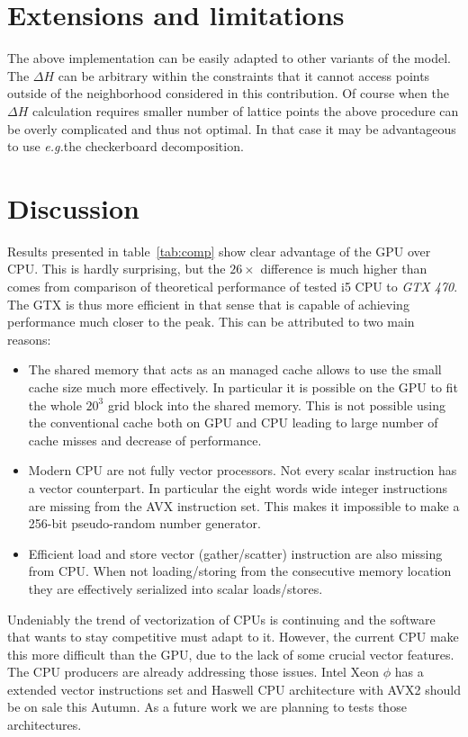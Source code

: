 \documentclass[a4paper]{llncs}
\newcommand{\eg}{\textit{e.g.}}
\begin{document}
\section{Extensions and limitations}

The above implementation can be easily adapted to other variants of
the model.  The $\Delta H$ can be arbitrary within the constraints
that it cannot access points outside of the neighborhood considered in
this contribution. Of course when the $\Delta H$ calculation requires
smaller number of lattice points the above procedure can be overly
complicated and thus not optimal. In that case it may be advantageous
to use \eg the checkerboard decomposition.


\section{Discussion}

Results presented in table~\ref{tab:comp} show clear advantage of the
GPU over CPU. This is hardly surprising, but the $26\times$ difference
is much higher than comes from comparison of theoretical performance of
tested i5 CPU to \emph{GTX 470}. The GTX is thus more efficient in
that sense that is capable of achieving performance much closer to the
peak. This can be attributed to two main reasons:
\begin{itemize}
\item The shared memory that acts as an managed cache allows to use
  the small cache size much more effectively. In particular it is
  possible on the GPU to fit the whole $20^3$ grid block into the
  shared memory. This is not possible using the conventional cache
  both on GPU and CPU leading to large number of cache misses and
  decrease of performance. 
\item Modern CPU are not fully vector processors. Not every scalar
  instruction has a vector counterpart. In particular the eight words
  wide integer instructions are missing from the AVX instruction set.
  This makes it impossible to make a 256-bit pseudo-random number
  generator.
\item Efficient load and store vector (gather/scatter) instruction are
  also missing from CPU.  When not loading/storing from the
  consecutive memory location they are effectively serialized into
  scalar loads/stores.
\end{itemize}

Undeniably the trend of vectorization of CPUs is continuing and the
software that wants to stay competitive must adapt to it.  However, the
current CPU make this more difficult than the GPU, due to the lack of
some crucial vector features.  The CPU producers are already
addressing those issues. Intel Xeon $\phi$ has a extended vector
instructions set and Haswell CPU architecture with AVX2 should be on
sale this Autumn. As a future work we are planning to tests those
architectures.
\end{document}
